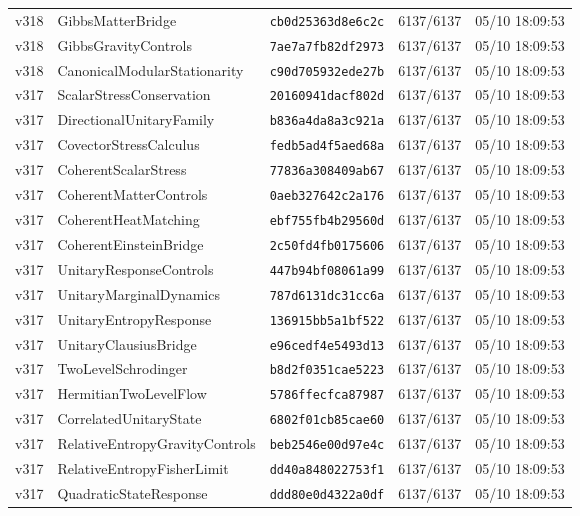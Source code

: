 \documentclass[11pt]{article}
\theoremstyle{definition}\newtheorem{deriv}{Derivação}
\begin{document}
{\begin{longtable}{@{}lllll@{}}
v318 & GibbsMatterBridge & \texttt{cb0d25363d8e6c2c} & 6137/6137 & 05/10 18:09:53 \\
v318 & GibbsGravityControls & \texttt{7ae7a7fb82df2973} & 6137/6137 & 05/10 18:09:53 \\
v318 & CanonicalModularStationarity & \texttt{c90d705932ede27b} & 6137/6137 & 05/10 18:09:53 \\
v317 & ScalarStressConservation & \texttt{20160941dacf802d} & 6137/6137 & 05/10 18:09:53 \\
v317 & DirectionalUnitaryFamily & \texttt{b836a4da8a3c921a} & 6137/6137 & 05/10 18:09:53 \\
v317 & CovectorStressCalculus & \texttt{fedb5ad4f5aed68a} & 6137/6137 & 05/10 18:09:53 \\
v317 & CoherentScalarStress & \texttt{77836a308409ab67} & 6137/6137 & 05/10 18:09:53 \\
v317 & CoherentMatterControls & \texttt{0aeb327642c2a176} & 6137/6137 & 05/10 18:09:53 \\
v317 & CoherentHeatMatching & \texttt{ebf755fb4b29560d} & 6137/6137 & 05/10 18:09:53 \\
v317 & CoherentEinsteinBridge & \texttt{2c50fd4fb0175606} & 6137/6137 & 05/10 18:09:53 \\
v317 & UnitaryResponseControls & \texttt{447b94bf08061a99} & 6137/6137 & 05/10 18:09:53 \\
v317 & UnitaryMarginalDynamics & \texttt{787d6131dc31cc6a} & 6137/6137 & 05/10 18:09:53 \\
v317 & UnitaryEntropyResponse & \texttt{136915bb5a1bf522} & 6137/6137 & 05/10 18:09:53 \\
v317 & UnitaryClausiusBridge & \texttt{e96cedf4e5493d13} & 6137/6137 & 05/10 18:09:53 \\
v317 & TwoLevelSchrodinger & \texttt{b8d2f0351cae5223} & 6137/6137 & 05/10 18:09:53 \\
v317 & HermitianTwoLevelFlow & \texttt{5786ffecfca87987} & 6137/6137 & 05/10 18:09:53 \\
v317 & CorrelatedUnitaryState & \texttt{6802f01cb85cae60} & 6137/6137 & 05/10 18:09:53 \\
v317 & RelativeEntropyGravityControls & \texttt{beb2546e00d97e4c} & 6137/6137 & 05/10 18:09:53 \\
v317 & RelativeEntropyFisherLimit & \texttt{dd40a848022753f1} & 6137/6137 & 05/10 18:09:53 \\
v317 & QuadraticStateResponse & \texttt{ddd80e0d4322a0df} & 6137/6137 & 05/10 18:09:53 \\

\end{longtable}}
\end{document}
